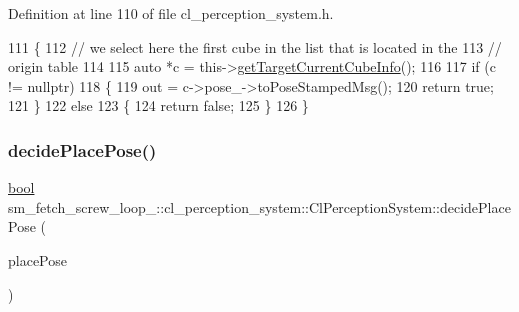Definition at line 110 of file cl\+\_\+perception\+\_\+system.\+h.


\begin{DoxyCode}
111             \{
112                 \textcolor{comment}{// we select here the first cube in the list that is located in the}
113                 \textcolor{comment}{// origin table}
114 
115                 \textcolor{keyword}{auto} *c = this->\hyperlink{classsm__fetch__screw__loop__1_1_1cl__perception__system_1_1ClPerceptionSystem_a7db81d4aa99849818668b52aee431816}{getTargetCurrentCubeInfo}();
116 
117                 \textcolor{keywordflow}{if} (c != \textcolor{keyword}{nullptr})
118                 \{
119                     out = c->pose\_->toPoseStampedMsg();
120                     \textcolor{keywordflow}{return} \textcolor{keyword}{true};
121                 \}
122                 \textcolor{keywordflow}{else}
123                 \{
124                     \textcolor{keywordflow}{return} \textcolor{keyword}{false};
125                 \}
126             \}
\end{DoxyCode}
\mbox{\label{classsm__fetch__screw__loop__1_1_1cl__perception__system_1_1ClPerceptionSystem_addd61eca413e2d927c636ef7fddaf91d}} 
\subsubsection{\texorpdfstring{decide\+Place\+Pose()}{decidePlacePose()}}
{\footnotesize\ttfamily \hyperlink{classbool}{bool} sm\+\_\+fetch\+\_\+screw\+\_\+loop\+\_\+::cl\+\_\+perception\+\_\+system\+::\+Cl\+Perception\+System\+::decide\+Place\+Pose (\begin{DoxyParamCaption}\item[{geometry\+\_\+msgs\+::\+Pose\+Stamped \&}]{place\+Pose }\end{DoxyParamCaption})\hspace{0.3cm}{\ttfamily [inline]}}



